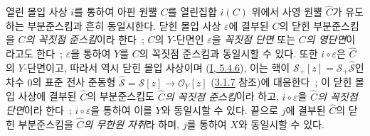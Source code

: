 \begin{env}[8.3.3]
\label{II.8.3.3-ko}
열린 몰입 사상 $i$를 통하여 아핀 원뿔 $C$를 열린집합 $i(C)$ 위에서
사영 원뿔 $\widehat{C}$가 유도하는 부분준스킴과 흔히 동일시한다.
닫힌 몰입 사상 $\varepsilon$에 결부된 $C$의 닫힌 부분준스킴을
\emph{$C$의 꼭짓점 준스킴}이라 한다~; $C$의 $Y$-단면인
$\varepsilon$을 \emph{꼭짓점 단면} 또는 \emph{$C$의 영단면}이라고도
한다~; $\varepsilon$을 통하여 $Y$를 $C$의 꼭짓점 준스킴과 동일시할
수 있다. 또한 $i\circ\varepsilon$은 $\widehat{C}$의 $Y$-단면이고,
따라서 역시 닫힌 몰입 사상이며
(\hyperref[I.5.4.6-ko]{I, 5.4.6}), 이는 핵이
$\mathcal{S}_+[z]=\mathcal{S}_+\widehat{\mathcal{S}}$인 차수 $0$의 표준
전사 준동형
$\widehat{\mathcal{S}}=\mathcal{S}[z]\to\mathcal{O}_Y[z]$
(\hyperref[II.3.1.7-ko]{3.1.7} 참조)에 대응한다~; 이 닫힌 몰입 사상에
결부된 $\widehat{C}$의 부분준스킴도 \emph{$\widehat{C}$의 꼭짓점
준스킴}이라 하고, $i\circ\varepsilon$을 \emph{$\widehat{C}$의 꼭짓점
단면}이라 한다~; $i\circ\varepsilon$을 통하여 이를 $Y$와 동일시할
수 있다. 끝으로 $j$에 결부된 $\widehat{C}$의 닫힌 부분준스킴을
\emph{$\widehat{C}$의 무한원 자취}라 하며, $j$를 통하여 $X$와
동일시할 수 있다.
\end{env}

